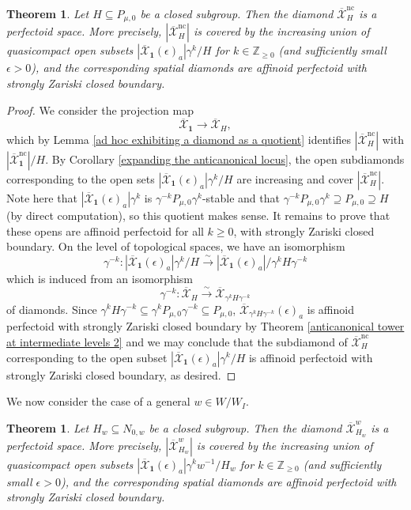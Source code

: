\documentclass{amsart}
\newtheorem{thm}[subsubsection]{Theorem}
\theoremstyle{remark}
\numberwithin{equation}{subsection}
\newcommand{\Z}{\ZZ}
\newcommand{\ZZ}{{\mathbb Z}}
\newcommand{\toisom}{\xrightarrow{\sim}}
\newcommand{\mbf}{\mathbf}
\newcommand{\ocX}{\overline{\mathcal{X}}}
\newcommand{\nc}{\mathrm{nc}}
\newcommand{\sub}{\subseteq}
\renewcommand{\(}{\left(}
\renewcommand{\)}{\right)}
\begin{document}
\begin{thm}\label{perfectoid non-canonical stratum} Let $H\sub P_{\mu,0}$ be a closed subgroup. Then the diamond 
  $\ocX^{\mathrm{nc}}_{H}$ is a perfectoid space. More precisely, $|\ocX^{\mathrm{nc}}_{H}|$ is covered by the increasing union of quasicompact open subsets $|\ocX_{\mbf{1}}(\epsilon)_{a}|\gamma^{k}/H$ for $k \in \Z_{\geq 0}$ (and sufficiently small $\epsilon >0$), and the corresponding spatial diamonds are affinoid perfectoid with strongly Zariski closed boundary.
\end{thm}

 

\begin{proof} 
We consider the projection map 
\[
\ocX_{\mbf{1}}\to \ocX_{H},
\]
which by Lemma \ref{ad hoc exhibiting a diamond as a quotient} identifies $|\ocX^{\mathrm{nc}}_{H}|$ with $|\ocX^{\mathrm{nc}}_{\mbf{1}}|/H$. By Corollary \ref{expanding the anticanonical locus}, the open subdiamonds corresponding to the open sets $|\ocX_{\mbf{1}}(\epsilon)_{a}|\gamma^{k}/H$ are increasing and cover $|\ocX^{\mathrm{nc}}_{H}|$. Note here that $|\ocX_{\mbf{1}}(\epsilon)_{a}|\gamma^{k}$ is $\gamma^{-k}P_{\mu,0}\gamma^{k}$-stable and that $\gamma^{-k}P_{\mu,0}\gamma^{k} \supseteq P_{\mu,0} \supseteq H$ (by direct computation), so this quotient makes sense. It remains to prove that these opens are affinoid perfectoid for all $k\geq 0$, with strongly Zariski closed boundary. On the level of topological spaces, we have an isomorphism
\[
 \gamma^{-k} \colon |\ocX_{\mbf{1}}(\epsilon)_{a}|\gamma^{k}/H \toisom |\ocX_{\mbf{1}}(\epsilon)_{a}|/\gamma^{k}H\gamma^{-k}
 \]
which is induced from an isomorphism 
\[ \gamma^{-k} \colon \ocX_{H} \toisom \ocX_{\gamma^{k} H \gamma^{-k}}
\]
of diamonds. Since $\gamma^{k}H\gamma^{-k} \sub \gamma^{k}P_{\mu,0}\gamma^{-k} \subseteq P_{\mu,0}$, $\ocX_{\gamma^{k} H \gamma^{-k}}(\epsilon)_{a}$ is affinoid perfectoid with strongly Zariski closed boundary by Theorem \ref{anticanonical tower at intermediate levels 2} and we may conclude that the subdiamond of $\ocX^{ \nc}_{H}$ corresponding to the open subset $|\ocX_{\mbf{1}}(\epsilon)_{a}|\gamma^{k}/H$ is affinoid perfectoid with strongly Zariski closed boundary, as desired.
\end{proof}

We now consider the case of a general $w \in W/W_I$.

\begin{thm}\label{general perfectoid stratum}\leavevmode Let $H_w\sub N_{0,w}$ be a closed subgroup. Then the diamond 
  $\ocX^{w}_{H_w}$ is a perfectoid space. More precisely, $|\ocX^{w}_{H_w}|$ is covered by the increasing union of quasicompact open subsets $|\ocX_{\mbf{1}}(\epsilon)_{a}|\gamma^{k}w^{-1}/H_w$ for $k \in \Z_{\geq 0}$ (and sufficiently small $\epsilon >0$), and the corresponding spatial diamonds are affinoid perfectoid with strongly Zariski closed boundary.
\end{thm}
\end{document}

